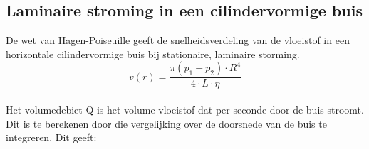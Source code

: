 \subsection{Laminaire stroming in een cilindervormige buis}

De wet van Hagen-Poiseuille geeft de snelheidsverdeling van de vloeistof 
in een horizontale cilindervormige buis bij stationaire, laminaire storming.
\\

$$v(r) = \frac{\pi(p_{1}-p_{2}) \cdot R^4}{4 \cdot L \cdot \eta}$$
\\
Het volumedebiet Q is het volume vloeistof dat per seconde door de buis stroomt.
Dit is te berekenen door die vergelijking over de doorsnede van de buis te integreren. 
Dit geeft: 

